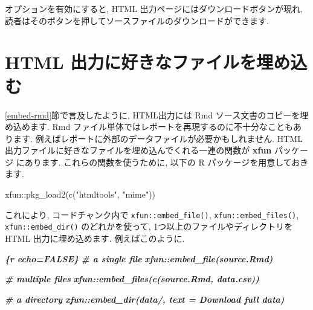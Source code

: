 \documentclass[
  11pt,
  lualatex,
  ja=standard]{bxjsreport}
\newenvironment{Shaded}{\begin{snugshade}}{\end{snugshade}}
\newcommand{\FunctionTok}[1]{\textcolor[rgb]{0.00,0.00,0.00}{#1}}
\newcommand{\InformationTok}[1]{\textcolor[rgb]{0.56,0.35,0.01}{\textbf{\textit{#1}}}}
\newcommand{\NormalTok}[1]{#1}
\newcommand{\SpecialCharTok}[1]{\textcolor[rgb]{0.00,0.00,0.00}{#1}}
\newcommand{\StringTok}[1]{\textcolor[rgb]{0.31,0.60,0.02}{#1}}
\begin{document}
オプションを有効にすると, HTML 出力ページにはダウンロードボタンが現れ, 読者はそのボタンを押してソースファイルのダウンロードができます.

\hypertarget{embed-file}{%
\section{HTML 出力に好きなファイルを埋め込む}\label{embed-file}}

\ref{embed-rmd}節で言及したように, HTML出力には Rmd ソース文書のコピーを埋め込めます. Rmd ファイル単体ではレポートを再現するのに不十分なこともあります. 例えばレポートに外部のデータファイルが必要かもしれません. HTML 出力ファイルに好きなファイルを埋め込んでくれる一連の関数が \textbf{xfun} パッケージ \autocite{R-xfun} にあります. これらの関数を使うために, 以下の R パッケージを用意しておきます.

\begin{Shaded}
\begin{Highlighting}[numbers=left,,]
\NormalTok{xfun}\SpecialCharTok{::}\FunctionTok{pkg\_load2}\NormalTok{(}\FunctionTok{c}\NormalTok{(}\StringTok{"htmltools"}\NormalTok{, }\StringTok{"mime"}\NormalTok{))}
\end{Highlighting}
\end{Shaded}

これにより, コードチャンク内で \texttt{xfun::embed\_file()}, \texttt{xfun::embed\_files()}, \texttt{xfun::embed\_dir()} のどれかを使って, 1つ以上のファイルやディレクトリを HTML 出力に埋め込めます. 例えばこのように.

\begin{Shaded}
\begin{Highlighting}[]
\InformationTok{\textasciigrave{}\textasciigrave{}\textasciigrave{}\{r echo=FALSE\}}
\InformationTok{\# a single file}
\InformationTok{xfun::embed\_file(\textquotesingle{}source.Rmd\textquotesingle{})}

\InformationTok{\# multiple files}
\InformationTok{xfun::embed\_files(c(\textquotesingle{}source.Rmd\textquotesingle{}, \textquotesingle{}data.csv\textquotesingle{}))}

\InformationTok{\# a directory}
\InformationTok{xfun::embed\_dir(\textquotesingle{}data/\textquotesingle{}, text = \textquotesingle{}Download full data\textquotesingle{})}
\InformationTok{\textasciigrave{}\textasciigrave{}\textasciigrave{}}
\end{Highlighting}
\end{Shaded}
\end{document}

